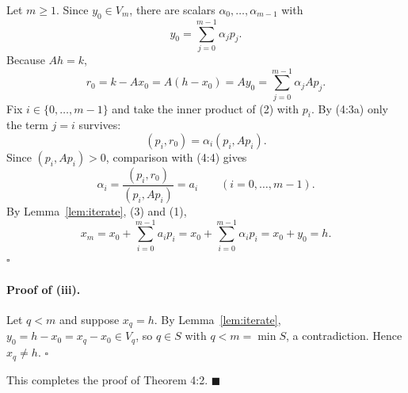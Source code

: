 \documentclass[11pt]{article}
\begin{document}
Let $m \ge 1$. Since $y_0 \in V_m$, there are scalars $\alpha_0, \dots, \alpha_{m-1}$ with
\begin{equation}
y_0 = \sum_{j=0}^{m-1} \alpha_j p_j. \tag{1}
\end{equation}
Because $Ah = k$,
\begin{equation}
r_0 = k - Ax_0 = A(h - x_0) = Ay_0 = \sum_{j=0}^{m-1} \alpha_j A p_j. \tag{2}
\end{equation}
Fix $i \in \{0, \dots, m-1\}$ and take the inner product of (2) with $p_i$. By (4:3a)
only the term $j = i$ survives:
\[
(p_i, r_0) = \alpha_i (p_i, Ap_i).
\]
Since $(p_i, Ap_i) > 0$, comparison with (4:4) gives
\begin{equation}
\alpha_i = \frac{(p_i, r_0)}{(p_i, Ap_i)} = a_i \qquad (i = 0, \dots, m-1). \tag{3}
\end{equation}
By Lemma~\ref{lem:iterate}, (3) and (1),
\[
x_m = x_0 + \sum_{i=0}^{m-1} a_i p_i = x_0 + \sum_{i=0}^{m-1} \alpha_i p_i = x_0 + y_0 = h.
\]
\hfill$\square$

\paragraph{Proof of (iii).}
Let $q < m$ and suppose $x_q = h$. By Lemma~\ref{lem:iterate},
$y_0 = h - x_0 = x_q - x_0 \in V_q$, so $q \in S$ with $q < m = \min S$,
a contradiction. Hence $x_q \neq h$. \hfill$\square$

\medskip
This completes the proof of Theorem 4:2. \hfill$\blacksquare$
\end{document}
